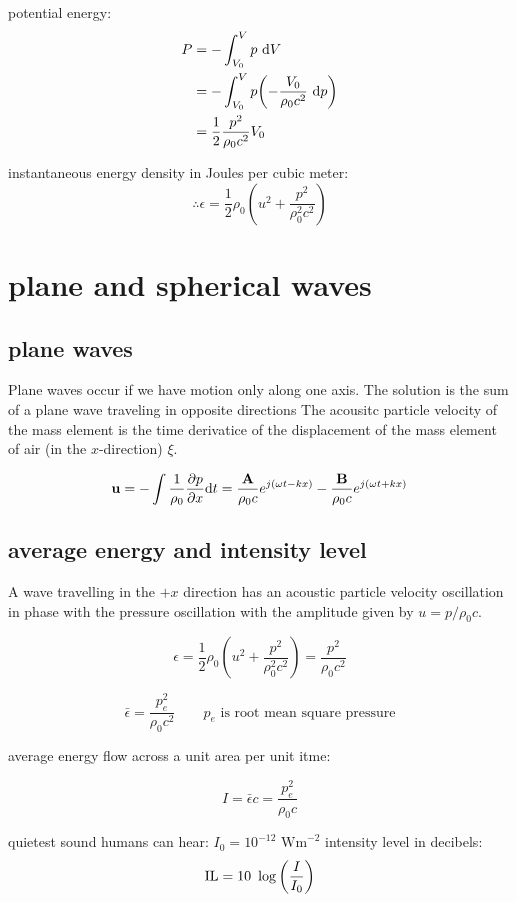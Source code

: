\documentclass[10pt, a4paper, twocolumn]{article}
\begin{document}
potential energy:
\begin{equation*}
\begin{aligned}
P &= -\int _{V_0}^{V}p\ \dd V
\\&=-\int _{V_0}^Vp \qty(-\frac{V_0}{\rho _0c^2}\ \dd p)
\\ &=\frac12\frac{p^2}{\rho _0 c^2}V_0
\end{aligned}
\end{equation*}

instantaneous energy density in Joules per cubic meter:
\[\therefore
\epsilon = \frac12 \rho _0 \left(
u^2 + \frac{p^2}{\rho _0^2c^2} \right) \]

\section{plane and spherical waves}
\subsection{plane waves}
Plane waves occur if we have motion only along one axis. The solution is the sum of a plane wave traveling in opposite directions
The acousitc particle velocity of the mass element is the time derivatice of the displacement of the mass element of air (in the $x$-direction) $\xi$.

\[\vb u = -\int \frac{1}{\rho _0} \pdv{p}{x} \dd t
=\frac{\vb A}{\rho _0 c}e^{j(\omega t - kx)}
-\frac{\vb B}{\rho _0 c}e^{j(\omega t + kx)} \]

\subsection{average energy and intensity level}

A wave travelling in the $+x$ direction has an acoustic particle velocity oscillation in phase with the pressure oscillation with the amplitude given by $u=p/\rho _0 c$. 

\[ \epsilon = \frac12 \rho _0 \left(
u^2 + \frac{p^2}{\rho _0^2c^2} \right)
=\frac{p^2}{\rho _0 c^2} \]

\[\bar \epsilon =\frac{p_e^2}{\rho _0 c^2}
\qquad p_e \text{ is root mean square pressure} \]

average energy flow across a unit area per unit itme:

\[I = \bar\epsilon c = \frac{p_e^2}{\rho _0c} \]

quietest sound humans can hear:
$I_0 = 10^{-12} \text{ Wm}^{-2}$
intensity level in decibels:
\[\text{IL} = 10\ \log \qty(\frac{I}{I_0}) \]
\end{document}
